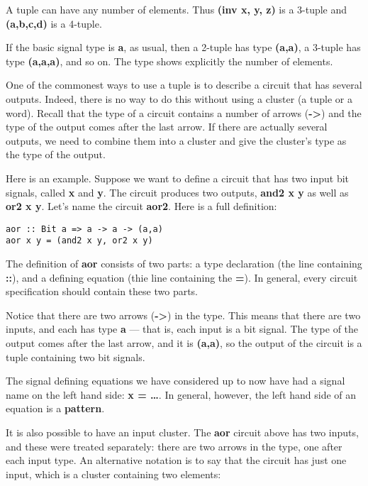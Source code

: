 \documentclass[11pt]{article}
\begin{document}
A tuple can have any number of elements.  Thus \textbf{(inv x, y, z)} is a
3-tuple and \textbf{(a,b,c,d)} is a 4-tuple.

If the basic signal type is \textbf{a}, as usual, then a 2-tuple has type
\textbf{(a,a)}, a 3-tuple has type \textbf{(a,a,a)}, and so on.  The type shows
explicitly the number of elements.

One of the commonest ways to use a tuple is to describe a circuit that
has several outputs.  Indeed, there is no way to do this without using
a cluster (a tuple or a word).  Recall that the type of a circuit
contains a number of arrows (\textbf{->}) and the type of the output comes
after the last arrow.  If there are actually several outputs, we need
to combine them into a cluster and give the cluster's type as the type
of the output.

Here is an example.  Suppose we want to define a circuit that has two
input bit signals, called \textbf{x} and \textbf{y}.  The circuit produces two
outputs, \textbf{and2 x y} as well as \textbf{or2 x y}.  Let's name the circuit
\textbf{aor2}.  Here is a full definition:

\begin{verbatim}
aor :: Bit a => a -> a -> (a,a)
aor x y = (and2 x y, or2 x y)
\end{verbatim}


The definition of \textbf{aor} consists of two parts: a type declaration (the
line containing \textbf{::}), and a defining equation (thie line containing
the \textbf{=}).  In general, every circuit specification should contain
these two parts.

Notice that there are two arrows (\textbf{->}) in the type.  This means that
there are two inputs, and each has type \textbf{a} --- that is, each input is
a bit signal.  The type of the output comes after the last arrow, and
it is \textbf{(a,a)}, so the output of the circuit is a tuple containing two
bit signals.

The signal defining equations we have considered up to now have had a
signal name on the left hand side: \textbf{x = \ldots{}}.  In general, however,
the left hand side of an equation is a \textbf{pattern}.

It is also possible to have an input cluster.  The \textbf{aor} circuit above
has two inputs, and these were treated separately: there are two
arrows in the type, one after each input type.  An alternative
notation is to say that the circuit has just one input, which is a
cluster containing two elements:
\end{document}
